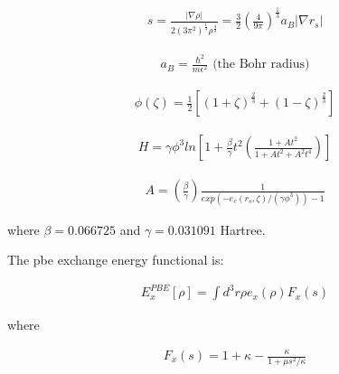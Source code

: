 \begin{equation}
\begin{split}
s = \frac{\lvert \nabla \rho \rvert}{2(3\pi^2)^{\frac{1}{3}} \rho^{\frac{4}{3}}} = \frac{3}{2} \left(\frac{4}{9\pi}\right)^{\frac{1}{3}} a_B \lvert \nabla r_s \rvert
\end{split}
\label{eq:functional9}
\end{equation}

\begin{equation}
\begin{split}
a_B = \frac{\hbar^2}{m \epsilon^2} \text{ (the Bohr radius)}
\end{split}
\label{eq:functional9}
\end{equation}


\begin{equation}
\begin{split}
\phi(\zeta) = \frac{1}{2} \left[(1+ \zeta)^{\frac{2}{3}} + (1 - \zeta)^{\frac{2}{3}}\right]
\end{split}
\label{eq:functional9}
\end{equation}

\begin{equation}
\begin{split}
H = \gamma \phi^3 ln \left[ 1+ \frac{\beta}{\gamma} t^2 \left(\frac{1+At^2}{1 + At^2 + A^2t^4} \right) \right]
\end{split}
\label{eq:functional9}
\end{equation}

\begin{equation}
\begin{split}
A = \left(\frac{\beta}{\gamma} \right) \frac{1}{exp(-e_c(r_s,\zeta) / (\gamma \phi^3))-1}
\end{split}
\label{eq:functional9}
\end{equation}

where $\beta = 0.066725$ and $\gamma = 0.031091$ Hartree.


The \acrshort{pbe} exchange energy functional is:

\begin{equation}
\begin{split}
E_{x}^{PBE} [\rho] = \int d^3r \rho e_x(\rho)F_x(s)
\end{split}
\label{eq:functional9}
\end{equation}

where

\begin{equation}
\begin{split}
F_x(s) = 1 + \kappa - \frac{\kappa}{1 + \mu s^2 / \kappa}
\end{split}
\label{eq:functional9}
\end{equation}

